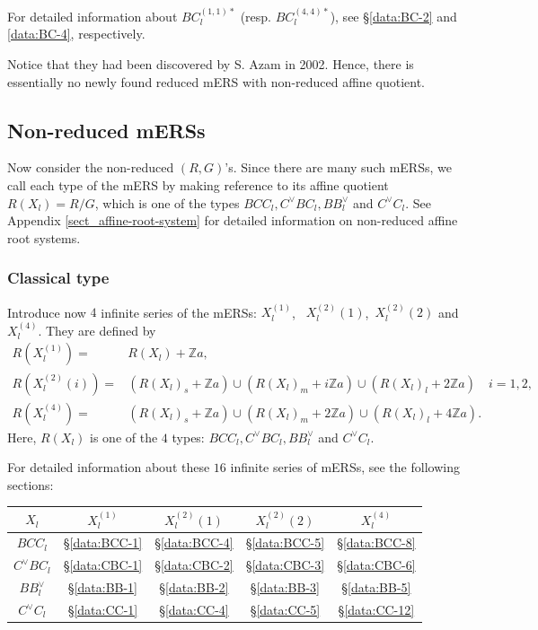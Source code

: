 \documentclass[11pt]{amsart}
\newcommand{\Z}{\mathbb{Z}}
\begin{document}
For detailed information about $BC_l^{(1,1)\ast}$ (resp. $BC_l^{(4,4)\ast}$), see \S \ref{data:BC-2} and \ref{data:BC-4}, respectively.


Notice that they had been discovered by S. Azam \cite{Azam2002} in 2002. 
Hence, there is essentially no newly found reduced mERS with non-reduced affine quotient.



\subsection{Non-reduced mERSs}
Now consider the non-reduced $(R,G)$'s. Since there are many such mERSs, we call each type of the mERS by making reference to its affine quotient $R(X_l)=R/G$,  which is one of the types $BCC_l, C^\vee BC_l, BB_l^\vee$ and $C^\vee C_l$. See Appendix \ref{sect_affine-root-system} for detailed information on non-reduced affine root systems.

\subsubsection{Classical type}\label{sect:intro_non-red-classic}
Introduce now $4$ infinite series of the mERSs: 
$X_l^{(1)}$, \, $X_l^{(2)}(1)$, \,$X_l^{(2)}(2)$ and 
$X_l^{(4)}$. They are defined by
\begin{align*}
R(X_l^{(1)})=
&R(X_l)+\Z a, \\
R(X_l^{(2)}(i))=
&(R(X_l)_s+\Z a) \cup (R(X_l)_m+i \Z a) \cup (R(X_l)_l+2\Z a) \quad i=1,2, \\
R(X_l^{(4)})=
&(R(X_l)_s+\Z a) \cup (R(X_l)_m+2\Z a) \cup (R(X_l)_l+4\Z a). 
\end{align*}
Here, $R(X_l)$ is one of the $4$ types: $BCC_l, C^\vee BC_l, BB_l^\vee$ and $C^\vee C_l$.
\smallskip

For detailed information about these $16$ infinite series of mERSs, see the following sections: \\
\begin{center}
\begin{tabular}{|c||c|c|c|c|} \hline
$X_l$ &  $X_l^{(1)}$ & $X_l^{(2)}(1)$ & $X_l^{(2)}(2)$  & $X_l^{(4)}$ \\ \hline
$BCC_l$ & \S \ref{data:BCC-1} & \S \ref{data:BCC-4} & \S \ref{data:BCC-5} & \S \ref{data:BCC-8}
\\ \hline
$C^\vee BC_l $ & \S \ref{data:CBC-1} & \S \ref{data:CBC-2} & \S \ref{data:CBC-3} &\S \ref{data:CBC-6} \\ \hline
$BB_l^\vee$ & \S \ref{data:BB-1} &\S \ref{data:BB-2} & \S \ref{data:BB-3}& \S \ref{data:BB-5}\\ \hline
$C^\vee C_l$  & \S \ref{data:CC-1} & \S \ref{data:CC-4}& \S \ref{data:CC-5}& \S \ref{data:CC-12}\\ \hline
\end{tabular}
\end{center}
\end{document}
